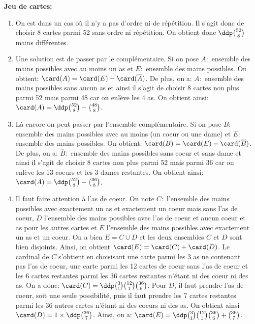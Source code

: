 \documentclass[a4paper, 11pt]{article}
\begin{document}
\begin{correction}  \; \textbf{Jeu de cartes:}
	\begin{enumerate}
		\item On est dans un cas o\`u il n'y a pas d'ordre ni de r\'ep\'etition. Il s'agit donc de choisir 8 cartes parmi 52 sans ordre ni r\'ep\'etition.
		      On obtient donc $\ddp \binom{52}{8}$ mains diff\'erentes.
		\item Une solution est de passer par le compl\'ementaire. Si on pose $A:$ ensemble des mains possibles avec au moins un as et $E:$ ensemble des mains possibles. On obtient: $\card (A)=\card (E)-\card (\overline{A})$. De plus, on a: $\overline{A}:$ ensemble des mains possibles sans aucun as et ainsi il s'agit de choisir 8 cartes non plus parmi 52 mais parmi 48 car on enl\`eve les 4 as. On obtient ainsi: $\card (A)=\ddp \binom{52}{8}-\binom{48}{8}$.
		\item L\`a encore on peut passer par l'ensemble compl\'ementaire. Si on pose $B:$ ensemble des mains possibles avec au moins (un coeur ou une dame) et $E:$ ensemble des mains possibles. On obtient: $\card (B)=\card (E)-\card (\overline{B})$. De plus, on a: $\overline{B}:$ ensemble des mains possibles sans coeur et sans dame et ainsi il s'agit de choisir 8 cartes non plus parmi 52 mais parmi 36 car on enl\`eve les 13 coeurs et les 3 dames restantes. On obtient ainsi: $\card (A)=\ddp \binom{52}{8}-\binom{36}{8}$.
		\item Il faut faire attention \`a l'as de coeur. On note $C:$ l'ensemble des mains possibles avec exactement un as et exactement un coeur mais sans l'as de coeur, $D$ l'ensemble des mains possibles avec l'as de coeur et aucun coeur et as pour les autres cartes et $E$ l'ensemble des mains possibles avec exactement un as et un coeur. On a bien $E=C\cup D$ et les deux ensembles $C$ et $D$ sont bien disjoints. Ainsi, on obtient $\card (E)=\card (C)+\card (D)$. Le cardinal de $C$ s'obtient en choisisant une carte parmi les 3 as ne contenant pas l'as de coeur, une carte parmi les 12 cartes de coeur sans l'as de coeur et les 6 cartes restantes parmi les 36 cartes restantes n'\'etant ni des coeur ni des as. On a donc: $\card (C)=\ddp \binom{3}{1}\binom{12}{1}\binom{36}{6}$. Pour $D$, il faut prendre l'as de coeur, soit une seule possibilit\'e, puis il faut prendre les 7 cartes restantes parmi les $36$ autres cartes n'\'etant ni des coeurs ni des as. On obtient ainsi $\card (D)=1\times \ddp \binom{36}{7}$. Ainsi, on a:
		      $\card (E)=\ddp\binom{3}{1}\binom{12}{1}\binom{36}{6} + \binom{36}{7}$.

\end{enumerate}
\end{correction}
\end{document}
